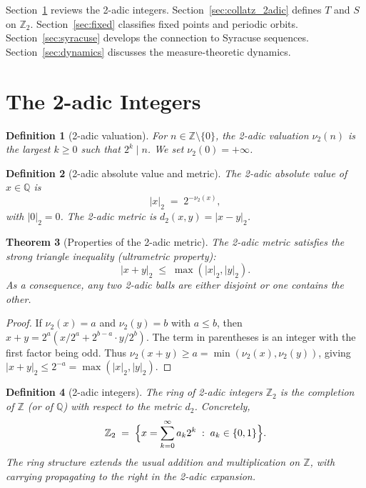 \documentclass[12pt,a4paper]{article}
\newtheorem{theorem}{Theorem}[section]
\newtheorem{definition}[theorem]{Definition}
\begin{document}
Section~\ref{sec:2adic} reviews the 2-adic integers. Section~\ref{sec:collatz_2adic}
defines $T$ and $S$ on $\mathbb{Z}_2$. Section~\ref{sec:fixed} classifies fixed points
and periodic orbits. Section~\ref{sec:syracuse} develops the connection to Syracuse
sequences. Section~\ref{sec:dynamics} discusses the measure-theoretic dynamics.

\section{The 2-adic Integers}\label{sec:2adic}

\begin{definition}[2-adic valuation]\label{def:val}
For $n \in \mathbb{Z} \setminus \{0\}$, the \emph{2-adic valuation} $\nu_2(n)$ is the
largest $k \geq 0$ such that $2^k \mid n$. We set $\nu_2(0) = +\infty$.
\end{definition}

\begin{definition}[2-adic absolute value and metric]\label{def:metric}
The \emph{2-adic absolute value} of $x \in \mathbb{Q}$ is
\[
  |x|_2 \;=\; 2^{-\nu_2(x)},
\]
with $|0|_2 = 0$. The \emph{2-adic metric} is $d_2(x,y) = |x-y|_2$.
\end{definition}

\begin{theorem}[Properties of the 2-adic metric]\label{thm:ultrametric}
The 2-adic metric satisfies the \emph{strong triangle inequality} (ultrametric property):
\[
  |x + y|_2 \;\leq\; \max(|x|_2, |y|_2).
\]
As a consequence, any two 2-adic balls are either disjoint or one contains the other.
\end{theorem}

\begin{proof}
If $\nu_2(x) = a$ and $\nu_2(y) = b$ with $a \leq b$, then
$x + y = 2^a(x/2^a + 2^{b-a} \cdot y/2^b)$.
The term in parentheses is an integer with the first factor being odd. Thus
$\nu_2(x+y) \geq a = \min(\nu_2(x), \nu_2(y))$, giving
$|x+y|_2 \leq 2^{-a} = \max(|x|_2, |y|_2)$.
\end{proof}

\begin{definition}[2-adic integers]\label{def:Z2}
The \emph{ring of 2-adic integers} $\mathbb{Z}_2$ is the completion of $\mathbb{Z}$
(or of $\mathbb{Q}$) with respect to the metric $d_2$. Concretely,
\[
  \mathbb{Z}_2 \;=\; \Bigl\{ x = \sum_{k=0}^\infty a_k 2^k \;:\; a_k \in \{0,1\} \Bigr\}.
\]
The ring structure extends the usual addition and multiplication on $\mathbb{Z}$, with
carrying propagating to the right in the 2-adic expansion.
\end{definition}
\end{document}
